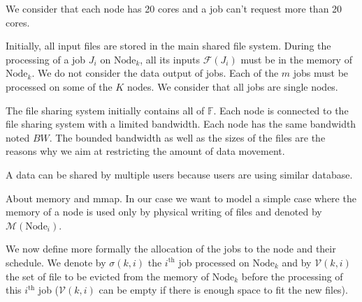 \documentclass[a4paper]{article}
\newcommand{\Node}[1]{\ensuremath{\mathrm{Node}_{#1}}\xspace}
\newcommand{\inputs}{\ensuremath{\mathcal{F}}\xspace}
\newcommand{\memory}{\ensuremath{\mathcal{M}}\xspace}
\newcommand{\memorymap}{\ensuremath{\mathcal{M}_{map}}\xspace}
\newcommand{\bandwidth}{\mathit{BW}\xspace}
\newcommand{\fileset}{\ensuremath{\mathbb{F}}\xspace}
\newcommand{\evict}{\ensuremath{\mathcal{V}}\xspace}
\begin{document}
We consider that each node has 20 cores and a job can't request more than 20 cores.

Initially, all input files are stored in the main shared file system.
During the processing of a job $J_i$ on $\Node{k}$, all its inputs
$\inputs(J_i)$ must be in the memory of $\Node{k}$. 
We do not consider the data output of jobs.
Each of the $m$ jobs must be processed on some of the $K$ nodes. 
We consider that all jobs are single nodes.

The file sharing system initially contains all of $\fileset$.
Each node is connected to the file sharing system with a limited bandwidth.
Each node has the same bandwidth noted $\bandwidth$.
The bounded bandwidth as well as the sizes of the files are the reasons why
we aim at restricting the amount of data movement.



A data can be shared by multiple users because users are using similar database.

About memory and mmap. In our case we want to model a simple case where the memory of a node
is used only by physical writing of files and denoted by $\memory(\Node{i})$.

We now define more formally the allocation of the jobs to the node and
their schedule.
We denote by $\sigma(k,i)$ the $i^\text{th}$ job
processed on $\Node{k}$ and by $\evict(k,i)$ the set of file to
be evicted from the memory of $\Node{k}$ before the processing
of this $i^\text{th}$ job ($\evict(k,i)$ can be empty if there is enough space to fit the new files).
\end{document}
